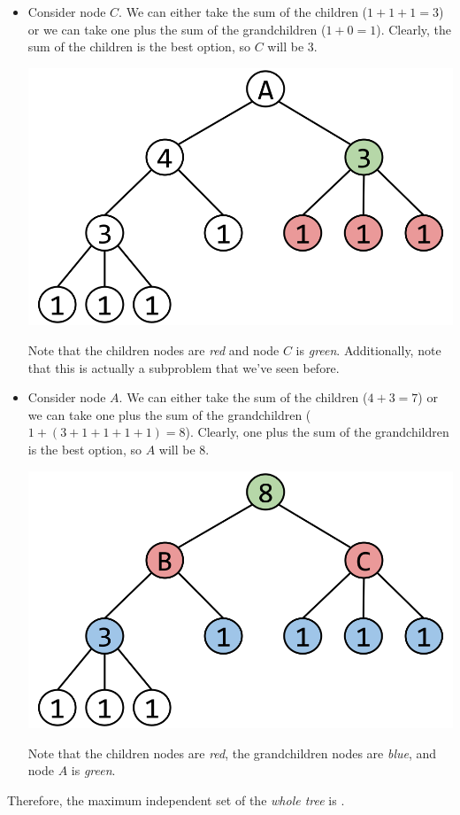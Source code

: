 \documentclass[letterpaper]{article}
\begin{document}
\begin{mdframed}[]
\begin{itemize}
        \item Consider node $C$. We can either take the sum of the children ($1 + 1 + 1 = 3$) or we can take one plus the sum of the grandchildren ($1 + 0 = 1$). Clearly, the sum of the children is the best option, so $C$ will be 3. 
        \begin{center}
            \includegraphics[scale=0.2]{assets/indep_set_ex_4.png}
        \end{center}
        Note that the children nodes are \emph{red} and node $C$ is \emph{green}. Additionally, note that this is actually a subproblem that we've seen before.

        \item Consider node $A$. We can either take the sum of the children ($4 + 3 = 7$) or we can take one plus the sum of the grandchildren ($1 + (3 + 1 + 1 + 1 + 1) = 8$). Clearly, one plus the sum of the grandchildren is the best option, so $A$ will be 8. 
        \begin{center}
            \includegraphics[scale=0.2]{assets/indep_set_ex_5.png}
        \end{center}
        Note that the children nodes are \emph{red}, the grandchildren nodes are \emph{blue}, and node $A$ is \emph{green}.
    \end{itemize}
    Therefore, the maximum independent set of the \emph{whole tree} is .
\end{mdframed}
\end{document}
